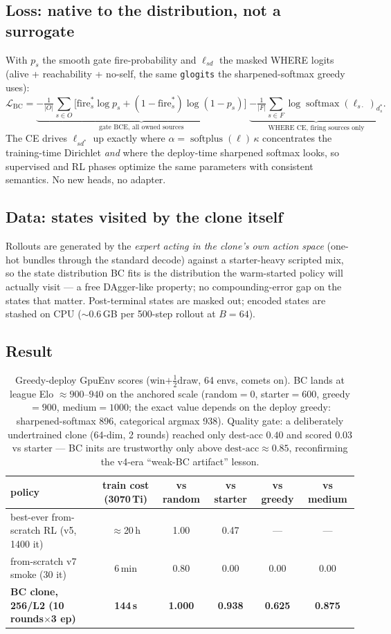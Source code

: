 \documentclass[11pt]{article}
\newcommand{\softplus}{\operatorname{softplus}}
\newcommand{\softmax}{\operatorname{softmax}}
\newcommand{\cd}[1]{\texttt{#1}}
\begin{document}
\subsection{Loss: native to the distribution, not a surrogate}
With $p_s$ the smooth gate fire-probability and $\ell_{sd}$ the masked WHERE logits (alive +
reachability + no-self, the same \cd{glogits} the sharpened-softmax greedy uses):
\[
\mathcal{L}_{\mathrm{BC}}
= \underbrace{-\tfrac{1}{|O|}\sum_{s\in O}\Big[\text{fire}^\ast_s\log p_s + (1-\text{fire}^\ast_s)\log(1-p_s)\Big]}_{\text{gate BCE, all owned sources}}
\;\underbrace{-\tfrac{1}{|F|}\sum_{s\in F}\log\softmax(\ell_{s\cdot})_{d^\ast_s}}_{\text{WHERE CE, firing sources only}} .
\]
The CE drives $\ell_{sd^\ast}$ up exactly where $\alpha = \softplus(\ell)\,\kappa$ concentrates the
training-time Dirichlet \emph{and} where the deploy-time sharpened softmax looks, so supervised and
RL phases optimize the same parameters with consistent semantics. No new heads, no adapter.

\subsection{Data: states visited by the clone itself}
Rollouts are generated by the \emph{expert acting in the clone's own action space} (one-hot bundles
through the standard decode) against a starter-heavy scripted mix, so the state distribution BC fits
is the distribution the warm-started policy will actually visit --- a free DAgger-like property; no
compounding-error gap on the states that matter. Post-terminal states are masked out; encoded states
are stashed on CPU ($\sim$0.6\,GB per 500-step rollout at $B{=}64$).

\subsection{Result}
\begin{table}[h]\centering\small
\begin{tabular}{@{}lccccc@{}}
\toprule
policy & train cost (3070\,Ti) & vs random & vs starter & vs greedy & vs medium \\
\midrule
best-ever from-scratch RL (v5, 1400 it) & $\approx$20\,h & 1.00 & 0.47 & --- & --- \\
from-scratch v7 smoke (30 it)           & 6\,min  & 0.80 & 0.00 & 0.00 & 0.00 \\
\textbf{BC clone, 256/L2 (10 rounds$\times$3 ep)} & \textbf{144\,s} & \textbf{1.000} & \textbf{0.938} & \textbf{0.625} & \textbf{0.875} \\
\bottomrule
\end{tabular}
\caption{Greedy-deploy GpuEnv scores (win$+\tfrac12$draw, 64 envs, comets on). BC lands at
league Elo $\approx 900$--$940$ on the anchored scale (random$=0$, starter$=600$, greedy$=900$,
medium$=1000$; the exact value depends on the deploy greedy: sharpened-softmax 896, categorical
argmax 938). Quality gate: a deliberately undertrained clone (64-dim, 2 rounds) reached only
dest-acc $0.40$ and scored $0.03$ vs starter --- BC inits are trustworthy only above
$\text{dest-acc}\approx 0.85$, reconfirming the v4-era ``weak-BC artifact'' lesson.}
\label{tab:bc}
\end{table}
\end{document}
